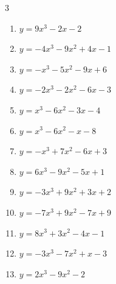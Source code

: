 \begin{multicols}{3}
\begin{enumerate}
  \item $y=9x^{3}-2x-2$


  \item $y=-4x^{3}-9x^{2}+4x-1$


  \item $y=-x^{3}-5x^{2}-9x+6$


  \item $y=-2x^{3}-2x^{2}-6x-3$


  \item $y=x^{3}-6x^{2}-3x-4$


  \item $y=x^{3}-6x^{2}-x-8$


  \item $y=-x^{3}+7x^{2}-6x+3$


\columnbreak %

  \item $y=6x^{3}-9x^{2}-5x+1$


  \item $y=-3x^{3}+9x^{2}+3x+2$


  \item $y=-7x^{3}+9x^{2}-7x+9$


  \item $y=8x^{3}+3x^{2}-4x-1$


  \item $y=-3x^{3}-7x^{2}+x-3$


  \item $y=2x^{3}-9x^{2}-2$


\end{enumerate}
\end{multicols}
